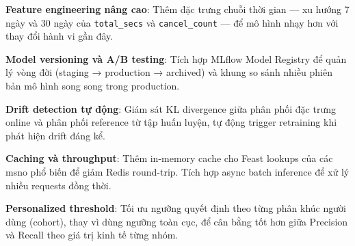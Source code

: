 \documentclass[conference]{IEEEtran}
\begin{document}
\textbf{Feature engineering nâng cao}: Thêm đặc trưng chuỗi thời gian — xu
hướng 7 ngày và 30 ngày của \texttt{total\_secs} và \texttt{cancel\_count} —
để mô hình nhạy hơn với thay đổi hành vi gần đây.

\textbf{Model versioning và A/B testing}: Tích hợp MLflow Model Registry để
quản lý vòng đời (staging → production → archived) và khung so sánh nhiều
phiên bản mô hình song song trong production.

\textbf{Drift detection tự động}: Giám sát KL divergence giữa phân phối đặc
trưng online và phân phối reference từ tập huấn luyện, tự động trigger
retraining khi phát hiện drift đáng kể.

\textbf{Caching và throughput}: Thêm in-memory cache cho Feast lookups của
các msno phổ biến để giảm Redis round-trip. Tích hợp async batch inference
để xử lý nhiều requests đồng thời.

\textbf{Personalized threshold}: Tối ưu ngưỡng quyết định theo từng phân
khúc người dùng (cohort), thay vì dùng ngưỡng toàn cục, để cân bằng tốt hơn
giữa Precision và Recall theo giá trị kinh tế từng nhóm.
\end{document}
